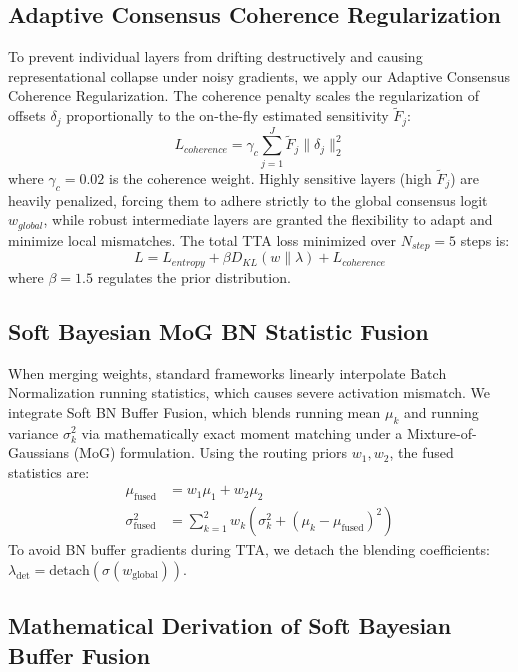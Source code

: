 \documentclass{article}
\theoremstyle{plain}
\theoremstyle{definition}
\theoremstyle{remark}
\begin{document}
\subsection{Adaptive Consensus Coherence Regularization}
To prevent individual layers from drifting destructively and causing representational collapse under noisy gradients, we apply our Adaptive Consensus Coherence Regularization. The coherence penalty scales the regularization of offsets $\delta_j$ proportionally to the on-the-fly estimated sensitivity $\tilde{F}_j$:
\begin{equation}
  L_{coherence} = \gamma_c \sum_{j=1}^J \tilde{F}_j \|\delta_j\|_2^2
\end{equation}
where $\gamma_c = 0.02$ is the coherence weight. Highly sensitive layers (high $\tilde{F}_j$) are heavily penalized, forcing them to adhere strictly to the global consensus logit $w_{global}$, while robust intermediate layers are granted the flexibility to adapt and minimize local mismatches. The total TTA loss minimized over $N_{step} = 5$ steps is:
\begin{equation}
  L = L_{entropy} + \beta D_{KL}(w \| \lambda) + L_{coherence}
\end{equation}
where $\beta = 1.5$ regulates the prior distribution.

\subsection{Soft Bayesian MoG BN Statistic Fusion}
When merging weights, standard frameworks linearly interpolate Batch Normalization running statistics, which causes severe activation mismatch. We integrate Soft BN Buffer Fusion, which blends running mean $\mu_k$ and running variance $\sigma_k^2$ via mathematically exact moment matching under a Mixture-of-Gaussians (MoG) formulation. Using the routing priors $w_1, w_2$, the fused statistics are:
\begin{align}
  \mu_{\mathrm{fused}} &= w_1 \mu_1 + w_2 \mu_2 \\
  \sigma_{\mathrm{fused}}^2 &= \sum_{k=1}^2 w_k \left( \sigma_k^2 + (\mu_k - \mu_{\mathrm{fused}})^2 \right)
\end{align}
To avoid BN buffer gradients during TTA, we detach the blending coefficients: $\lambda_{\mathrm{det}} = \mathrm{detach}(\sigma(w_{\mathrm{global}}))$.

\subsection{Mathematical Derivation of Soft Bayesian Buffer Fusion}
\label{subsec:derivation}
\end{document}
